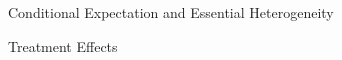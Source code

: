 \begin{frame}
	\begin{figure}\caption{Conditional Expectation and Essential Heterogeneity}
	\end{figure}
\end{frame}
\begin{frame}
	\begin{figure}[htp]\centering
		\caption{Treatment Effects}
	\end{figure}
\end{frame}
